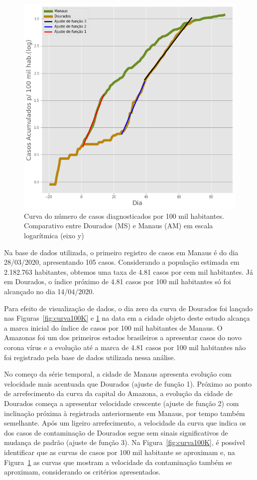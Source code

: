 \documentclass[12pt]{article}
\begin{document}
\begin{figure}[!htb]
  \centering
  \includegraphics[width=.6\textwidth]{figs/Dourados_Manaus_casos_log.png}
  \caption{Curva do número de casos diagnosticados por 100 mil habitantes. Comparativo entre Dourados (MS) e Manaus (AM) em escala logarítmica (eixo y)}
  \label{fig:curva100KLog}
  \end{figure}

Na base de dados utilizada, o primeiro registro de casos em Manaus é do dia 28/03/2020, apresentando 105 casos. Considerando a população estimada em 2.182.763 habitantes, obtemos uma taxa de 4.81 casos por cem mil habitantes. Já em Dourados, o índice próximo de 4.81 casos por 100 mil habitantes só foi alcançado no dia 14/04/2020.

Para efeito de visualização de dados, o dia zero da curva de Dourados foi lançado nas Figuras~\ref{fig:curva100K} e \ref{fig:curva100KLog} na data em a cidade objeto deste estudo alcança a marca inicial do índice de casos por 100 mil habitantes de Manaus. O Amazonas foi um dos primeiros estados brasileiros a apresentar casos do novo corona vírus e a evolução até a marca de 4.81 casos por 100 mil habitantes
não foi registrado pela base de dados utilizada nessa análise. 

No começo da série temporal, a cidade de Manaus apresenta evolução com velocidade mais acentuada que Dourados (ajuste de função 1). Próximo ao ponto de arrefecimento da curva da capital do Amazona, a evolução da cidade de Dourados começa a apresentar velocidade crescente (ajuste de função 2) com inclinação próxima à registrada anteriormente em Manaus, por tempo também semelhante. Após um ligeiro arrefecimento, a velocidade da curva que indica os dos casos de contaminação de Dourados segue sem sinais significativos de mudança de padrão (ajuste de função 3). Na Figura~\ref{fig:curva100K}, é possível identificar que as curvas de casos por 100 mil habitante se aproximam e, na Figura~\ref{fig:curva100KLog} as curvas que mostram a velocidade da contaminação também se aproximam, considerando os critérios apresentados.
\end{document}
